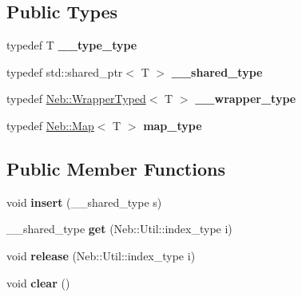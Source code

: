 \subsection*{\-Public \-Types}
\begin{DoxyCompactItemize}
\item 
\hypertarget{classNeb_1_1Util_1_1Parent_ad05787b75eda23bc9e7d72953594f909}{typedef \-T {\bfseries \-\_\-\-\_\-type\-\_\-type}}\label{classNeb_1_1Util_1_1Parent_ad05787b75eda23bc9e7d72953594f909}

\item 
\hypertarget{classNeb_1_1Util_1_1Parent_a9e54b64f4988000354f83262c59a2def}{typedef std\-::shared\-\_\-ptr$<$ \-T $>$ {\bfseries \-\_\-\-\_\-shared\-\_\-type}}\label{classNeb_1_1Util_1_1Parent_a9e54b64f4988000354f83262c59a2def}

\item 
\hypertarget{classNeb_1_1Util_1_1Parent_adbbf2efbf5641dd25389d1d79c76a6fb}{typedef \hyperlink{classNeb_1_1WrapperTyped}{\-Neb\-::\-Wrapper\-Typed}$<$ \-T $>$ {\bfseries \-\_\-\-\_\-wrapper\-\_\-type}}\label{classNeb_1_1Util_1_1Parent_adbbf2efbf5641dd25389d1d79c76a6fb}

\item 
\hypertarget{classNeb_1_1Util_1_1Parent_ac8ca91c68b6d725c3908855e1792c1ca}{typedef \hyperlink{classNeb_1_1Map}{\-Neb\-::\-Map}$<$ \-T $>$ {\bfseries map\-\_\-type}}\label{classNeb_1_1Util_1_1Parent_ac8ca91c68b6d725c3908855e1792c1ca}

\end{DoxyCompactItemize}
\subsection*{\-Public \-Member \-Functions}
\begin{DoxyCompactItemize}
\item 
\hypertarget{classNeb_1_1Util_1_1Parent_ab9cecc39fdd77920d7d5471d1a467d93}{void {\bfseries insert} (\-\_\-\-\_\-shared\-\_\-type s)}\label{classNeb_1_1Util_1_1Parent_ab9cecc39fdd77920d7d5471d1a467d93}

\item 
\hypertarget{classNeb_1_1Util_1_1Parent_aeca1b4297312127b7a90d98548376bc3}{\-\_\-\-\_\-shared\-\_\-type {\bfseries get} (\-Neb\-::\-Util\-::index\-\_\-type i)}\label{classNeb_1_1Util_1_1Parent_aeca1b4297312127b7a90d98548376bc3}

\item 
\hypertarget{classNeb_1_1Util_1_1Parent_a3676b1236b86a6286a38862e1f1c1116}{void {\bfseries release} (\-Neb\-::\-Util\-::index\-\_\-type i)}\label{classNeb_1_1Util_1_1Parent_a3676b1236b86a6286a38862e1f1c1116}

\item 
\hypertarget{classNeb_1_1Util_1_1Parent_afe9bba96339bf7a42f94ee6c865c4eae}{void {\bfseries clear} ()}\label{classNeb_1_1Util_1_1Parent_afe9bba96339bf7a42f94ee6c865c4eae}

\end{DoxyCompactItemize}
